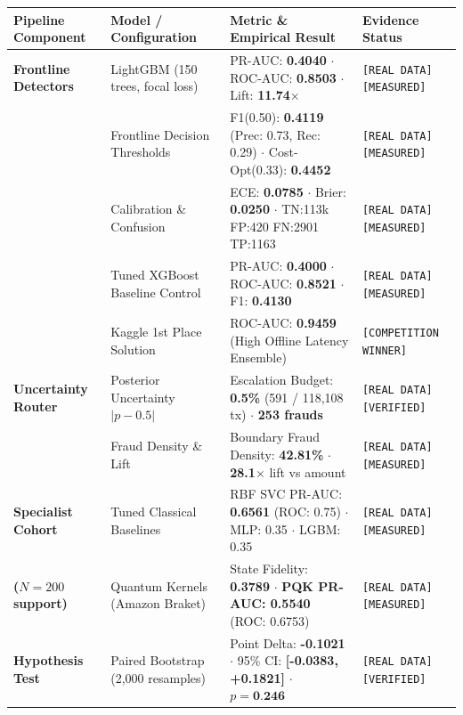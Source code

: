 \documentclass[10pt,a4paper]{article}
\begin{document}
\vspace{-4pt}
\begin{center}
\renewcommand{\arraystretch}{0.68}
\label{tab:results}
\vspace{1pt}
\begin{tabularx}{\linewidth}{@{}p{2.8cm}Xp{5.0cm}p{3.2cm}@{}}
\toprule
\textbf{Pipeline Component} & \textbf{Model / Configuration} & \textbf{Metric \& Empirical Result} & \textbf{Evidence Status} \\
\midrule
\textbf{Frontline Detectors} & LightGBM (150 trees, focal loss) & PR-AUC: \textbf{0.4040} $\cdot$ ROC-AUC: \textbf{0.8503} $\cdot$ Lift: \textbf{11.74$\times$} & \texttt{[REAL DATA][MEASURED]} \\
& Frontline Decision Thresholds & F1(0.50): \textbf{0.4119} (Prec: 0.73, Rec: 0.29) $\cdot$ Cost-Opt(0.33): \textbf{0.4452} & \texttt{[REAL DATA][MEASURED]} \\
& Calibration \& Confusion & ECE: \textbf{0.0785} $\cdot$ Brier: \textbf{0.0250} $\cdot$ TN:113k FP:420 FN:2901 TP:1163 & \texttt{[REAL DATA][MEASURED]} \\
& Tuned XGBoost Baseline Control & PR-AUC: \textbf{0.4000} $\cdot$ ROC-AUC: \textbf{0.8521} $\cdot$ F1: \textbf{0.4130} & \texttt{[REAL DATA][MEASURED]} \\
& Kaggle 1st Place Solution & ROC-AUC: \textbf{0.9459} (High Offline Latency Ensemble) & \texttt{[COMPETITION WINNER]} \\
\midrule
\textbf{Uncertainty Router} & Posterior Uncertainty $|p-0.5|$ & Escalation Budget: \textbf{0.5\%} (591 / 118,108 tx) $\cdot$ \textbf{253 frauds} & \texttt{[REAL DATA][VERIFIED]} \\
& Fraud Density \& Lift & Boundary Fraud Density: \textbf{42.81\%} $\cdot$ \textbf{28.1$\times$} lift vs amount & \texttt{[REAL DATA][MEASURED]} \\
\midrule
\textbf{Specialist Cohort} & Tuned Classical Baselines & RBF SVC PR-AUC: \textbf{0.6561} (ROC: 0.75) $\cdot$ MLP: 0.35 $\cdot$ LGBM: 0.35 & \texttt{[REAL DATA][MEASURED]} \\
\textbf{($N=200$ support)} & Quantum Kernels (Amazon Braket) & State Fidelity: \textbf{0.3789} $\cdot$ \textbf{PQK PR-AUC: 0.5540} (ROC: 0.6753) & \texttt{[REAL DATA][MEASURED]} \\
\midrule
\textbf{Hypothesis Test} & Paired Bootstrap (2,000 resamples) & Point Delta: \textbf{-0.1021} $\cdot$ 95\% CI: \textbf{[-0.0383, +0.1821]} $\cdot$ $p = \textbf{0.246}$ & \texttt{[REAL DATA][VERIFIED]} \\

\end{tabularx}
\end{center}
\end{document}
